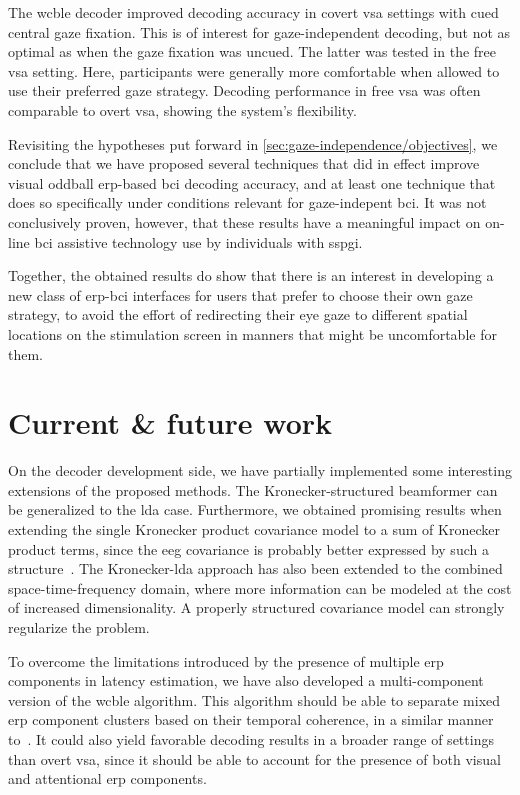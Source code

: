 The \ac{wcble} decoder improved decoding accuracy in covert
\ac{vsa} settings with cued central gaze fixation.
This is of interest for gaze-independent decoding, but not as optimal as when the
gaze fixation was uncued.
The latter was tested in the free \ac{vsa} setting.
Here, participants were generally more comfortable when allowed to use their
preferred gaze strategy.
Decoding performance in free \ac{vsa} was often comparable to overt \ac{vsa},
showing the system's flexibility.

Revisiting the hypotheses put forward in
\cref{sec:gaze-independence/objectives}, we conclude that we have proposed
several techniques that did in effect improve visual oddball \ac{erp}-based
\ac{bci} decoding accuracy, and at least one technique that does so specifically
under conditions relevant for gaze-indepent \ac{bci}.
It was not conclusively proven, however, that these results have a meaningful
impact on on-line \ac{bci} assistive technology use by individuals with
\ac{sspgi}.

Together, the obtained results do show that there is an interest in developing
a new class of \ac{erp}-\ac{bci} interfaces for users that prefer to choose their own gaze strategy, to
avoid the effort of redirecting their eye gaze to different spatial locations
on the stimulation screen in manners that might be uncomfortable for them.

\section{Current \& future work}
On the decoder development side, we have partially implemented some interesting
extensions of the proposed methods.
The Kronecker-structured beamformer can be generalized to the \ac{lda} case.
Furthermore, we obtained promising results when extending the single
Kronecker product covariance model to a sum of Kronecker product terms, since
the \ac{eeg} covariance is probably better expressed by such a
structure~\cite{Bijma2005}.
The Kronecker-\ac{lda} approach has also been extended to the combined
space-time-frequency domain, where more information can be modeled at the cost
of increased dimensionality.
A properly structured covariance model can strongly regularize the problem.

To overcome the limitations introduced by the presence of multiple \ac{erp}
components in latency estimation, we have also developed a multi-component
version of the \ac{wcble} algorithm.
This algorithm should be able to separate mixed \ac{erp} component clusters
based on their temporal coherence, in a similar manner to~\textcite{Ouyang2017}.
It could also yield favorable decoding results in a broader range of settings
than overt \ac{vsa}, since it should be able to account for the presence of both
visual and attentional \ac{erp} components.

